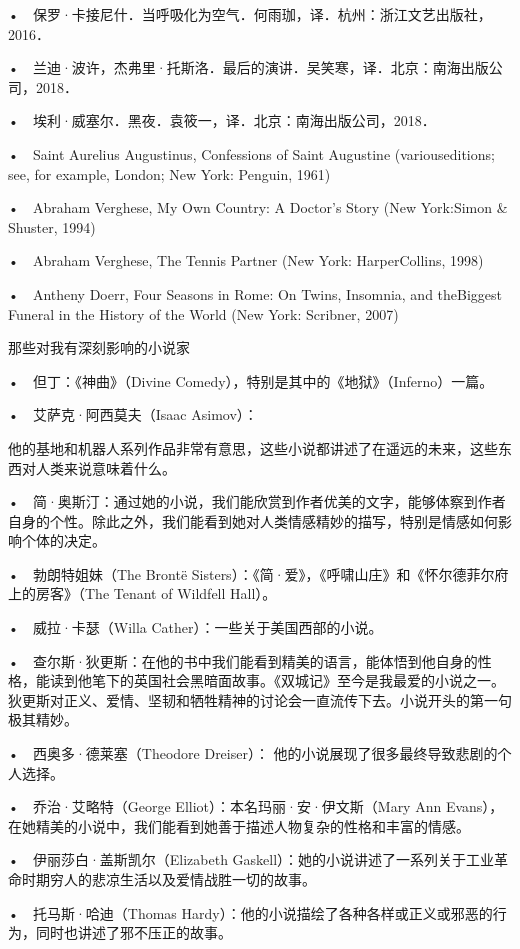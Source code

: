 •　保罗·卡接尼什．当呼吸化为空气．何雨珈，译．杭州：浙江文艺出版社，2016．

•　兰迪·波许，杰弗里·托斯洛．最后的演讲．吴笑寒，译．北京：南海出版公司，2018．

•　埃利·威塞尔．黑夜．袁筱一，译．北京：南海出版公司，2018．

•　Saint Aurelius Augustinus, Confessions of Saint Augustine (variouseditions; see, for example, London; New York: Penguin, 1961)

•　Abraham Verghese, My Own Country: A Doctor’s Story (New York:Simon \& Shuster, 1994)

•　Abraham Verghese, The Tennis Partner (New York: HarperCollins, 1998)

•　Antheny Doerr, Four Seasons in Rome: On Twins, Insomnia, and theBiggest Funeral in the History of the World (New York: Scribner, 2007)


那些对我有深刻影响的小说家

•　但丁：《神曲》（Divine Comedy），特别是其中的《地狱》（Inferno）一篇。

•　艾萨克·阿西莫夫（Isaac Asimov）：

他的基地和机器人系列作品非常有意思，这些小说都讲述了在遥远的未来，这些东西对人类来说意味着什么。

•　简·奥斯汀：通过她的小说，我们能欣赏到作者优美的文字，能够体察到作者自身的个性。除此之外，我们能看到她对人类情感精妙的描写，特别是情感如何影响个体的决定。

•　勃朗特姐妹（The Brontë Sisters）：《简·爱》，《呼啸山庄》和《怀尔德菲尔府上的房客》（The Tenant of Wildfell Hall）。

•　威拉·卡瑟（Willa Cather）：一些关于美国西部的小说。

•　查尔斯·狄更斯：在他的书中我们能看到精美的语言，能体悟到他自身的性格，能读到他笔下的英国社会黑暗面故事。《双城记》至今是我最爱的小说之一。狄更斯对正义、爱情、坚韧和牺牲精神的讨论会一直流传下去。小说开头的第一句极其精妙。


•　西奥多·德莱塞（Theodore Dreiser）：
他的小说展现了很多最终导致悲剧的个人选择。

•　乔治·艾略特（George Elliot）：本名玛丽·安·伊文斯（Mary Ann Evans），在她精美的小说中，我们能看到她善于描述人物复杂的性格和丰富的情感。

•　伊丽莎白·盖斯凯尔（Elizabeth Gaskell）：她的小说讲述了一系列关于工业革命时期穷人的悲凉生活以及爱情战胜一切的故事。

•　托马斯·哈迪（Thomas Hardy）：他的小说描绘了各种各样或正义或邪恶的行为，同时也讲述了邪不压正的故事。

